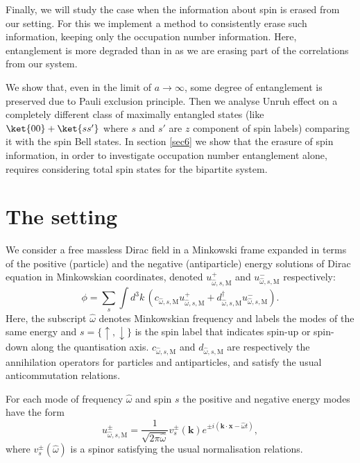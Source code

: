 Finally, we will study the case when the information about spin is erased from our setting. For this we implement a method to consistently erase such information, keeping only the occupation number information. Here, entanglement is more degraded than in \cite{AlsingSchul} as we are erasing part of the correlations from our system. 

We show that, even in the limit of $a\rightarrow\infty$, some degree of entanglement is preserved due to Pauli exclusion principle. Then we analyse Unruh effect on a completely different class of maximally entangled states (like $\ket{00}+\ket{ss'}$ where $s$ and $s'$ are $z$ component of spin labels) comparing it with the spin Bell states. In section \ref{sec6} we show that the erasure of spin information, in order to investigate occupation number entanglement alone, requires considering total spin states for the bipartite system. 

\section{The setting}\label{sec2}

We consider a free massless Dirac field in a Minkowski frame expanded in terms of the positive (particle) and the negative (antiparticle) energy solutions of Dirac equation in Minkowskian coordinates, denoted $u^+_{\hat\omega,s,\text{M}}$ and $u^-_{\hat\omega,s,\text{M}}$ respectively:
\begin{equation}\label{field}
\phi=\sum_{s}\int d^3k\, (c_{\hat\omega,s,\text{M}}u^+_{\hat\omega,s,\text{M}}+d_{\hat\omega,s,\text{M}}^\dagger u^-_{\hat\omega,s,\text{M}}).
\end{equation}
Here, the subscript $\hat\omega$ denotes Minkowskian frequency and labels the modes of the same energy and $s=\{\uparrow ,\downarrow\}$ is the spin label that indicates spin-up or spin-down along the quantisation axis. $c_{\hat\omega,s,\text{M}}$ and $d_{\hat\omega,s,\text{M}}$ are respectively the annihilation operators for particles and antiparticles, and satisfy the usual anticommutation relations.

For each mode of frequency $\hat\omega$ and spin $s$ the positive and negative energy modes have the form
\begin{equation}\label{eq2}
u^\pm_{\hat\omega,s,\text{M}} =\frac{1}{\sqrt{2\pi \hat\omega}}v^\pm_s(\bm k) e^{\pm i(\bm k\cdot\bm x- \hat\omega t)},\end{equation}
where $v^\pm_s(\hat\omega)$ is a spinor satisfying the usual normalisation relations.

